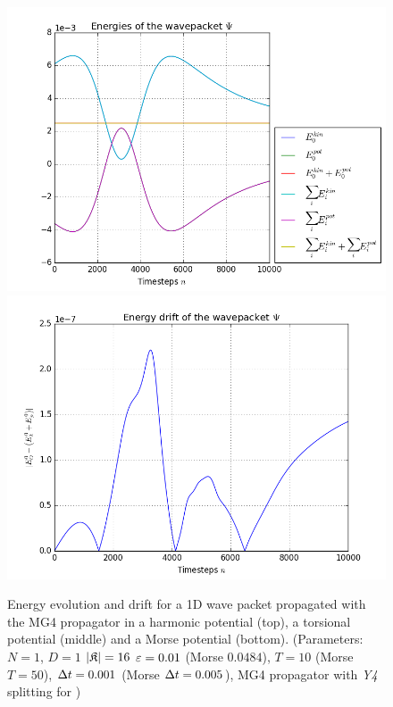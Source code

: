 \begin{figure}[ht]
	\includegraphics[width=.45\textwidth]{figures/morse_1D_MG4_energies.png}
	\includegraphics[width=.45\textwidth]{figures/morse_1D_MG4_drift.png}
	\caption{Energy evolution and drift for a 1D wave packet propagated with the MG4 propagator in a harmonic potential (top), a torsional potential (middle) and a Morse potential (bottom).
	(Parameters: $N=1$, $D=1$ $|\mathfrak{K}|=16$ $\varepsilon=0.01$ (Morse $0.0484$), $T=10$ (Morse $T=50$), $\Delta t=0.001$ (Morse $\Delta t=0.005$), MG4 propagator with \emph{Y4} splitting for )}
	\label{fig:energy_MG4}
\end{figure}
%
